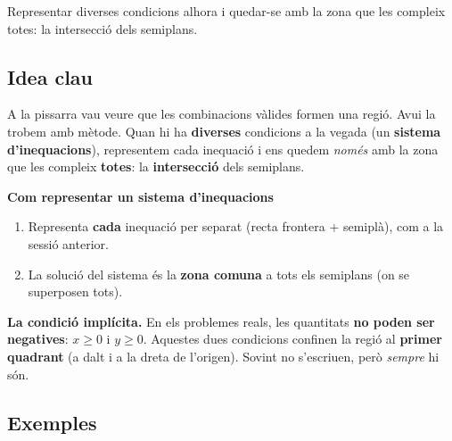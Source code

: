 %
{Representar diverses condicions alhora i quedar-se amb la zona que les compleix totes: la intersecció dels semiplans.}

\subsection{Idea clau}

A la pissarra vau veure que les combinacions vàlides formen una regió. Avui la trobem
amb mètode. Quan hi ha \textbf{diverses} condicions a la vegada (un
\textbf{sistema d'inequacions}), representem cada inequació i ens quedem
\emph{només} amb la zona que les compleix \textbf{totes}: la \textbf{intersecció}
dels semiplans.

\begin{idea}
\textbf{Com representar un sistema d'inequacions}
\begin{enumerate}[leftmargin=1.6em, itemsep=2pt]
  \item Representa \textbf{cada} inequació per separat (recta frontera + semiplà), com
        a la sessió anterior.
  \item La solució del sistema és la \textbf{zona comuna} a tots els semiplans (on se
        superposen tots).
\end{enumerate}
\textbf{La condició implícita.} En els problemes reals, les quantitats \textbf{no
poden ser negatives}: $x\ge 0$ i $y\ge 0$. Aquestes dues condicions confinen la regió
al \textbf{primer quadrant} (a dalt i a la dreta de l'origen). Sovint no s'escriuen,
però \emph{sempre} hi són.
\end{idea}

\subsection{Exemples}

